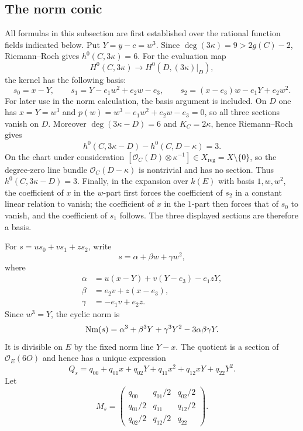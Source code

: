 \subsection{The norm conic}

All formulas in this subsection are first established over the rational
function fields indicated below.  Put $Y=y-c=w^3$.  Since
$\deg(3\kappa)=9>2g(C)-2$, Riemann--Roch gives
$h^0(C,3\kappa)=6$.  For the evaluation map
\[
 H^0(C,3\kappa)\longrightarrow H^0(D,(3\kappa)|_D),
\]
the kernel has the following basis:
\[
 s_0=x-Y,
 \qquad
 s_1=Y-e_1w^2+e_2w-e_3,
 \qquad
 s_2=(x-e_3)w-e_1Y+e_2w^2.
\]
For later use in the norm calculation, the basis argument is included.  On $D$ one has $x=Y=w^3$ and
$p(w)=w^3-e_1w^2+e_2w-e_3=0$, so all three sections vanish on $D$.  Moreover
$\deg(3\kappa-D)=6$ and $K_C=2\kappa$, hence Riemann--Roch gives
\[
 h^0(C,3\kappa-D)-h^0(C,D-\kappa)=3.
\]
On the chart under consideration
$[\mathcal O_C(D)\otimes\kappa^{-1}]\in X_{\mathrm{reg}}=X\setminus\{0\}$,
so the degree-zero line bundle $\mathcal O_C(D-\kappa)$ is nontrivial and
has no section.  Thus $h^0(C,3\kappa-D)=3$.  Finally, in the expansion over
$k(E)$ with basis $1,w,w^2$, the coefficient of $x$ in the $w$-part first
forces the coefficient of $s_2$ in a constant linear relation to vanish;
the coefficient of $x$ in the $1$-part then forces that of $s_0$ to vanish,
and the coefficient of $s_1$ follows.  The three displayed sections are
therefore a basis.

For $s=us_0+vs_1+zs_2$, write
\[
 s=\alpha+\beta w+\gamma w^2,
\]
where
\[
 \begin{aligned}
 \alpha&=u(x-Y)+v(Y-e_3)-e_1zY,\\
 \beta&=e_2v+z(x-e_3),\\
 \gamma&=-e_1v+e_2z.
 \end{aligned}
\]
Since $w^3=Y$, the cyclic norm is
\begin{equation}
 \operatorname{Nm}(s)=\alpha^3+\beta^3Y+\gamma^3Y^2-3\alpha\beta\gamma Y.
\label{eq:cyclic-norm}
\end{equation}
It is divisible on $E$ by the fixed norm line $Y-x$.  The quotient is a
section of $\mathcal O_E(6O)$ and hence has a unique expression
\[
 Q_s=q_{00}+q_{01}x+q_{02}Y+q_{11}x^2+q_{12}xY+q_{22}Y^2.
\]
Let
\[
 M_s=
 \begin{pmatrix}
 q_{00}&q_{01}/2&q_{02}/2\\
 q_{01}/2&q_{11}&q_{12}/2\\
 q_{02}/2&q_{12}/2&q_{22}
 \end{pmatrix}.
\]

